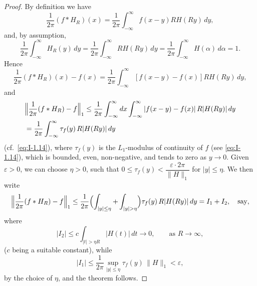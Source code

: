 \begin{proof}
By definition we have
\begin{equation*}
\frac{1}{2\pi}(f*H_R)(x)=\frac{1}{2\pi}\int_{-\infty}^{\infty}f(x-y)RH(Ry)\,dy,
\end{equation*}
and, by assumption,
\begin{equation*}
\frac{1}{2\pi}\int_{-\infty}^{\infty}H_R(y)\,dy
=\frac{1}{2\pi}\int_{-\infty}^{\infty}RH(Ry)\,dy
=\frac{1}{2\pi}\int_{-\infty}^{\infty}H(\alpha)\,d\alpha=1.
\end{equation*}
Hence
\begin{equation*}
\frac{1}{2\pi}(f*H_R)(x)-f(x)
=\frac{1}{2\pi}\int_{-\infty}^{\infty}[f(x-y)-f(x)]RH(Ry)\,dy,
\end{equation*}
and
\begin{equation*}
\begin{aligned}
&\Bigl\|\frac{1}{2\pi}(f*H_R)-f\Bigr\|_1 \le \frac{1}{2\pi}\int_{-\infty}^{\infty}dx\int_{-\infty}^{\infty}|f(x-y)-f(x)|\,R|H(Ry)|\,dy\\
&= \frac{1}{2\pi}\int_{-\infty}^{\infty}\tau_f(y)\,R|H(Ry)|\,dy
\end{aligned}
\end{equation*}
(cf.\ \eqref{eq:I-1.14}), where $\tau_f(y)$ is the $L_1$-modulus of continuity of $f$ (see \eqref{eq:I-1.14}), which is bounded, even, non-negative, and tends to zero as $y\to 0$. Given $\varepsilon>0$, we can choose $\eta>0$, such that $0\le\tau_f(y)<\dfrac{\varepsilon\cdot 2\pi}{\|H\|_1}$ for $|y|\le\eta$. We then write
\begin{equation*}
\Bigl\|\frac{1}{2\pi}(f*H_R)-f\Bigr\|_1
\le\frac{1}{2\pi}\Bigl(\int_{|y|\le\eta}+\int_{|y|>\eta}\Bigr)\tau_f(y)\,R|H(Ry)|\,dy
=I_1+I_2,\quad\text{say},
\end{equation*}
where
\begin{equation*}
|I_2|\le c\int_{|t|>\eta R}|H(t)|\,dt\to 0,\qquad\text{as }R\to\infty,
\end{equation*}
($c$ being a suitable constant), while
\begin{equation*}
|I_1|\le\frac{1}{2\pi}\sup_{|y|\le\eta}\tau_f(y)\,\|H\|_1<\varepsilon,
\end{equation*}
by the choice of $\eta$, and the theorem follows.
\end{proof}

